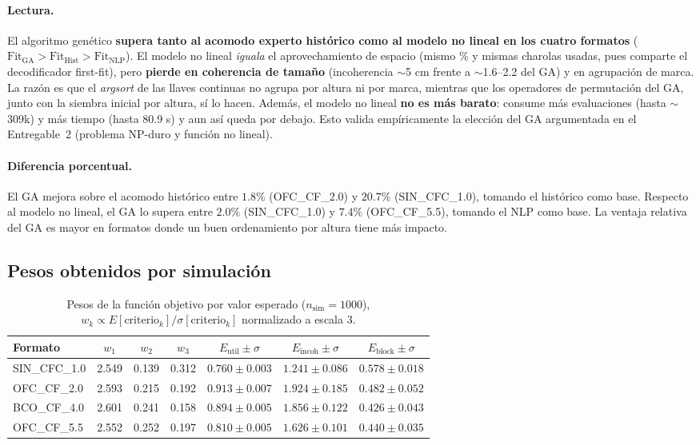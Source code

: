 \documentclass[11pt,letterpaper]{article}
\newcommand{\thead}[1]{\rowcolor{headgray}#1}
\begin{document}
\paragraph{Lectura.} El algoritmo gen\'etico \textbf{supera tanto al acomodo experto
hist\'orico como al modelo no lineal en los cuatro formatos}
($\text{Fit}_{\text{GA}}>\text{Fit}_{\text{Hist}}>\text{Fit}_{\text{NLP}}$). El
modelo no lineal \emph{iguala} el aprovechamiento de espacio (mismo \% y mismas
charolas usadas, pues comparte el decodificador first-fit), pero \textbf{pierde en
coherencia de tama\~no} (incoherencia $\sim$5 cm frente a $\sim$1.6--2.2 del GA) y en
agrupaci\'on de marca. La raz\'on es que el \emph{argsort} de las llaves continuas no
agrupa por altura ni por marca, mientras que los operadores de permutaci\'on del GA,
junto con la siembra inicial por altura, s\'i lo hacen. Adem\'as, el modelo no lineal
\textbf{no es m\'as barato}: consume m\'as evaluaciones (hasta $\sim$309k) y m\'as
tiempo (hasta 80.9 s) y aun as\'i queda por debajo. Esto valida emp\'iricamente la
elecci\'on del GA argumentada en el Entregable~2 (problema NP-duro y funci\'on no
lineal).

\paragraph{Diferencia porcentual.} El GA mejora sobre el acomodo hist\'orico entre
$1.8\%$ (OFC\_CF\_2.0) y $20.7\%$ (SIN\_CFC\_1.0), tomando el hist\'orico como base.
Respecto al modelo no lineal, el GA lo supera entre $2.0\%$ (SIN\_CFC\_1.0) y $7.4\%$
(OFC\_CF\_5.5), tomando el NLP como base. La ventaja relativa del GA es mayor en
formatos donde un buen ordenamiento por altura tiene m\'as impacto.

\subsection{Pesos obtenidos por simulaci\'on}
\begin{table}[H]
\centering\small
\begin{tabular}{lcccccc}
\toprule
\thead{\textbf{Formato}} & $w_1$ & $w_2$ & $w_3$ &
$E_{\text{util}}\pm\sigma$ & $E_{\text{incoh}}\pm\sigma$ & $E_{\text{block}}\pm\sigma$ \\
\midrule
SIN\_CFC\_1.0 & 2.549 & 0.139 & 0.312 & $0.760\pm0.003$ & $1.241\pm0.086$ & $0.578\pm0.018$ \\
OFC\_CF\_2.0  & 2.593 & 0.215 & 0.192 & $0.913\pm0.007$ & $1.924\pm0.185$ & $0.482\pm0.052$ \\
BCO\_CF\_4.0  & 2.601 & 0.241 & 0.158 & $0.894\pm0.005$ & $1.856\pm0.122$ & $0.426\pm0.043$ \\
OFC\_CF\_5.5  & 2.552 & 0.252 & 0.197 & $0.810\pm0.005$ & $1.626\pm0.101$ & $0.440\pm0.035$ \\
\bottomrule
\end{tabular}
\caption{Pesos de la funci\'on objetivo por valor esperado ($n_{\text{sim}}=1000$),
$w_k\propto E[\text{criterio}_k]/\sigma[\text{criterio}_k]$ normalizado a escala 3.}
\label{tab:pesos}
\end{table}
\end{document}
